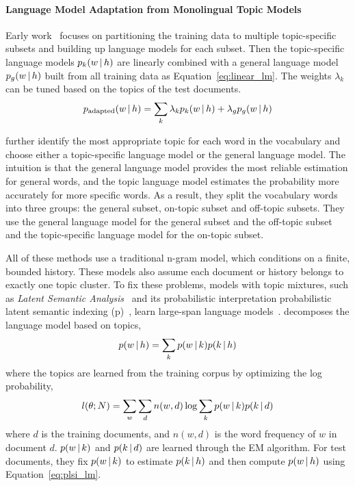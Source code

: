 \paragraph{Language Model Adaptation from Monolingual Topic Models}

Early work~\citep{Clarkson-1997,Seymore-1997,Kneser-1997,Iyer-1999} focuses on
partitioning the training data to multiple topic-specific subsets and
building up language models for each subset. Then the topic-specific
language models $p_k(w \, | \, h)$ are linearly combined with a general
language model $p_g(w \, | \, h)$ built from all training data as
Equation~\ref{eq:linear_lm}. The weights $\lambda_k$ can be tuned
based on the topics of the test documents.
\begin{align}
\label{eq:linear_lm}
p_\textrm{adapted}(w \, | \, h) = \sum_k \lambda_k p_k(w \, | \, h) + \lambda_g
  p_g(w \, | \, h)
\end{align}

\citet{Seymore-1998} further identify the most appropriate topic for
each word in the vocabulary and choose either a topic-specific language model
or the general language model. The intuition is that the general
language model provides the most reliable estimation for general
words, and the topic language model estimates the probability more
accurately for more specific words. As a result, they split the vocabulary
words into three groups: the general subset, on-topic subset and
off-topic subsets. They use the general language model for the general subset and the off-topic subset and the topic-specific language model for  the
on-topic subset.

All of these methods use a traditional n-gram model, which conditions on a finite, bounded history.
These models also assume each document or history belongs
to exactly one topic cluster.
To fix these problems, models with topic mixtures, such as
\emph{Latent Semantic Analysis}~\citep[\textsc{lsa}]{deerwester-90}
and its probabilistic interpretation probabilistic latent semantic
indexing (p)~\citep[\textsc{plsi}]{hofmann-99},
learn large-span language
models~\citep{Bellegarda-1997,Coccaro-1998,Gildea-1999}. \citet{Gildea-1999}
decomposes the language model based on topics,
\begin{align}
\label{eq:plsi_lm}
p(w \, | \, h) = \sum_k p(w \, | \, k) p(k \, | \, h)
\end{align}
where the topics are learned from the training corpus by optimizing the log probability,
\begin{align}
l(\theta; N) = \sum_w \sum_d n(w, d) \log \sum_k p(w \, | \, k) p(k \, | \, d)
\end{align}
where $d$ is the training documents, and $n(w,d)$ is the word
frequency of $w$ in document $d$. $p(w \, | \, k)$ and $p(k \, | \, d)$ are
learned through the EM algorithm. For test documents, they fix $p(w \, | \,
k)$ to estimate $p(k \, | \, h)$ and then compute $p(w \, | \, h)$ using Equation~\ref{eq:plsi_lm}. 

